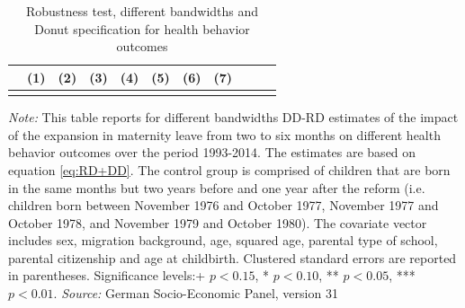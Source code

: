 \documentclass[a4paper ]{article}
\begin{document}
\begin{landscape}
\begin{table}[p] \centering
\def\sym#1{\ifmmode^{#1}\else\(^{#1}\)\fi}
\caption{Robustness test, different bandwidths and Donut specification for health behavior outcomes}\label{tab:HBBW}

\begin{tabular}{l*{10}{c}}
\toprule
 &\multicolumn{1}{c}{(1)}&\multicolumn{1}{c}{(2)}&\multicolumn{1}{c}{(3)}&\multicolumn{1}{c}{(4)}&\multicolumn{1}{c}{(5)}&\multicolumn{1}{c}{(6)}&\multicolumn{1}{c}{(7)}\\

\midrule\\
	 
 \bottomrule
\end{tabular}
\begin{minipage}{1.4\textwidth} %
{\footnotesize \textit{Note:} This table reports for different bandwidths DD-RD estimates of the impact of the expansion in maternity leave from two to six months on different health behavior outcomes over the period 1993-2014. The estimates are based on equation \ref{eq:RD+DD}. The control group is comprised of children that are born in the same months but two years before and one year after the reform (i.e. children born between November 1976 and October 1977, November 1977 and October 1978, and November 1979 and October 1980). The covariate vector includes sex, migration background, age, squared age, parental type of school, parental citizenship and age at childbirth.\newline
Clustered standard errors are reported in parentheses. Significance levels:+ \(p<0.15\), * \(p<0.10\), ** \(p<0.05\), *** \(p<0.01\). \newline \textit{Source: }German Socio-Economic Panel, version 31\par}
\end{minipage}
\end{table}
\end{landscape}

\end{document}
